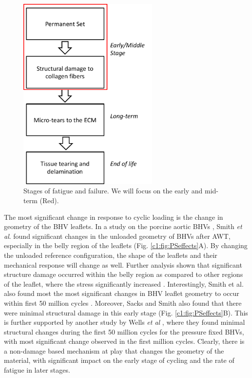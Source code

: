 \begin{figure}[hbt]
\centering
\includegraphics[width=2.75in]{Images/chapter1/damageprocess.pdf}
\caption{Stages of fatigue and failure. We will focus on the early and mid-term (Red).}
\label{c1:fig:damageprocess}
\end{figure}

    The most significant change in response to cyclic loading is the change in geometry of the BHV leaflets. In a study on the porcine aortic BHVs \cite{smith_high_1997},  Smith \textit{et al}. found significant changes in the unloaded geometry of BHVs after AWT, especially in the belly region of the leaflets (Fig. \ref{c1:fig:PSeffects}A). By changing the unloaded reference configuration, the shape of the leaflets and their mechanical response will change as well. Further analysis shown that significant structure damage occurred within the belly region as compared to other regions of the leaflet, where the stress significantly increased \cite{smith_fatigue_1999}. Interestingly, Smith et al. also found most the most significant changes in BHV leaflet geometry to occur within first 50 million cycles \cite{smith_high_1997}. Moreover, Sacks and Smith \cite{sacks_effects_1998} also found that there were minimal structural damage in this early stage (Fig. \ref{c1:fig:PSeffects}B). This is further supported by another study by Wells \textit{et al} \cite{wells_cyclic_2005}, where they found minimal structural changes during the first 50 million cycles for the pressure fixed BHVs, with most significant change observed in the first million cycles. Clearly, there is a non-damage based mechanism at play that changes the geometry of the material, with significant impact on the early stage of cycling and the rate of fatigue in later stages. 


